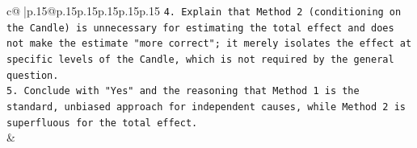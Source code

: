 \documentclass{article}
\begin{document}
{\begin{supertabular}{c@{$\;$}|p{.15\linewidth}@{}p{.15\linewidth}p{.15\linewidth}p{.15\linewidth}p{.15\linewidth}p{.15\linewidth}}
{{{\texttt{4.  Explain that Method 2 (conditioning on the Candle) is unnecessary for estimating the total effect and does not make the estimate "more correct"; it merely isolates the effect at specific levels of the Candle, which is not required by the general question.} \\
\texttt{5.  Conclude with "Yes" and the reasoning that Method 1 is the standard, unbiased approach for independent causes, while Method 2 is superfluous for the total effect.} \\
            }
        }
    }
    & \\ \\

\end{supertabular}
}
\end{document}
